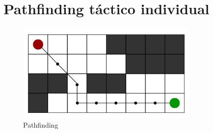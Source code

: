 \documentclass[bigger]{beamer}
\begin{document}
\section{Pathfinding táctico individual}

\begin{frame}[b]
\frametitle{\secname} %
\framesubtitle{} %
\rmfamily %
\color{black} %
\begin{figure}
    \centering
    \includegraphics[width=0.8\textwidth]{a-star.png}
    \caption{Pathfinding}
\end{figure}
\end{frame}
\end{document}
